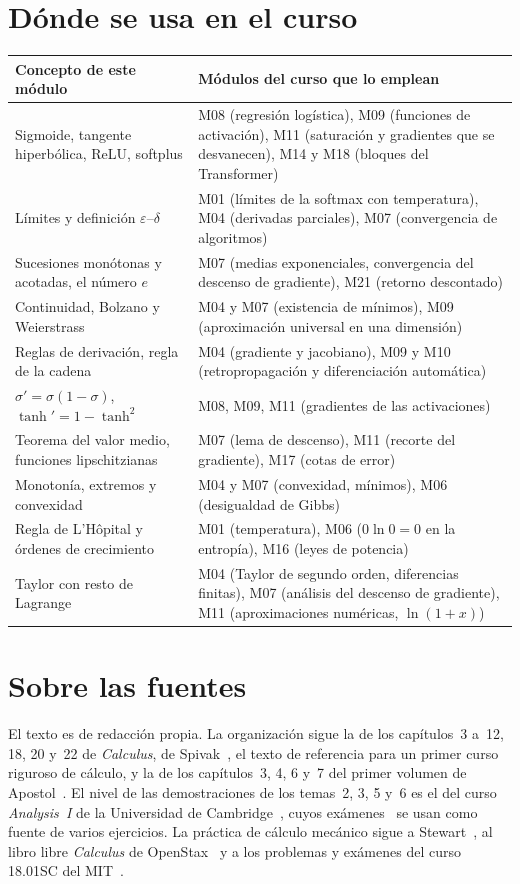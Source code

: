 \documentclass[11pt,a4paper,twoside,openany]{book}
\begin{document}
\section*{Dónde se usa en el curso}
\begin{center}
\small
\begin{tabularx}{\textwidth}{@{}>{\raggedright\arraybackslash}p{5.0cm}>{\raggedright\arraybackslash}X@{}}
\toprule
Concepto de este módulo & Módulos del curso que lo emplean \\
\midrule
Sigmoide, tangente hiperbólica, ReLU, softplus & M08 (regresión logística), M09 (funciones de activación), M11 (saturación y gradientes que se desvanecen), M14 y M18 (bloques del Transformer) \\
Límites y definición $\varepsilon$--$\delta$ & M01 (límites de la softmax con temperatura), M04 (derivadas parciales), M07 (convergencia de algoritmos) \\
Sucesiones monótonas y acotadas, el número $e$ & M07 (medias exponenciales, convergencia del descenso de gradiente), M21 (retorno descontado) \\
Continuidad, Bolzano y Weierstrass & M04 y M07 (existencia de mínimos), M09 (aproximación universal en una dimensión) \\
Reglas de derivación, regla de la cadena & M04 (gradiente y jacobiano), M09 y M10 (retropropagación y diferenciación automática) \\
$\sigma'=\sigma(1-\sigma)$, $\tanh'=1-\tanh^{2}$ & M08, M09, M11 (gradientes de las activaciones) \\
Teorema del valor medio, funciones lipschitzianas & M07 (lema de descenso), M11 (recorte del gradiente), M17 (cotas de error) \\
Monotonía, extremos y convexidad & M04 y M07 (convexidad, mínimos), M06 (desigualdad de Gibbs) \\
Regla de L'Hôpital y órdenes de crecimiento & M01 (temperatura), M06 ($0\ln 0=0$ en la entropía), M16 (leyes de potencia) \\
Taylor con resto de Lagrange & M04 (Taylor de segundo orden, diferencias finitas), M07 (análisis del descenso de gradiente), M11 (aproximaciones numéricas, $\ln(1+x)$) \\
\bottomrule
\end{tabularx}
\end{center}

\section*{Sobre las fuentes}
El texto es de redacción propia. La organización sigue la de los capítulos~3 a~12, 18, 20 y~22 de \emph{Calculus}, de Spivak~\cite{spivak}, el texto de referencia para un primer curso riguroso de cálculo, y la de los capítulos~3, 4, 6 y~7 del primer volumen de Apostol~\cite{apostol}. El nivel de las demostraciones de los temas~2, 3, 5 y~6 es el del curso \emph{Analysis~I} de la Universidad de Cambridge~\cite{cambA1}, cuyos exámenes~\cite{tripos2013,tripos2019} se usan como fuente de varios ejercicios. La práctica de cálculo mecánico sigue a Stewart~\cite{stewart}, al libro libre \emph{Calculus} de OpenStax~\cite{osc1,osc2} y a los problemas y exámenes del curso 18.01SC del MIT~\cite{mit1801,mit1801ex}.
\end{document}
